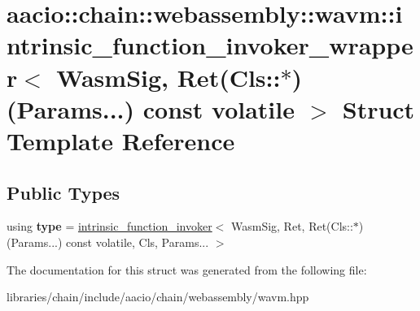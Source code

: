 \hypertarget{structaacio_1_1chain_1_1webassembly_1_1wavm_1_1intrinsic__function__invoker__wrapper_3_01_wasm_sd7f818ed20799f79a40b8c5a2cb3a8ce}{}\section{aacio\+:\+:chain\+:\+:webassembly\+:\+:wavm\+:\+:intrinsic\+\_\+function\+\_\+invoker\+\_\+wrapper$<$ Wasm\+Sig, Ret(Cls\+:\+:$\ast$)(Params...) const volatile $>$ Struct Template Reference}
\label{structaacio_1_1chain_1_1webassembly_1_1wavm_1_1intrinsic__function__invoker__wrapper_3_01_wasm_sd7f818ed20799f79a40b8c5a2cb3a8ce}
\subsection*{Public Types}
\begin{DoxyCompactItemize}
\item 
\mbox{\label{structaacio_1_1chain_1_1webassembly_1_1wavm_1_1intrinsic__function__invoker__wrapper_3_01_wasm_sd7f818ed20799f79a40b8c5a2cb3a8ce_a2834ac8c31b167fcda1a24aa6645a727}} 
using {\bfseries type} = \mbox{\hyperlink{structaacio_1_1chain_1_1webassembly_1_1wavm_1_1intrinsic__function__invoker}{intrinsic\+\_\+function\+\_\+invoker}}$<$ Wasm\+Sig, Ret, Ret(Cls\+::$\ast$)(Params...) const volatile, Cls, Params... $>$
\end{DoxyCompactItemize}


The documentation for this struct was generated from the following file\+:\begin{DoxyCompactItemize}
\item 
libraries/chain/include/aacio/chain/webassembly/wavm.\+hpp\end{DoxyCompactItemize}
